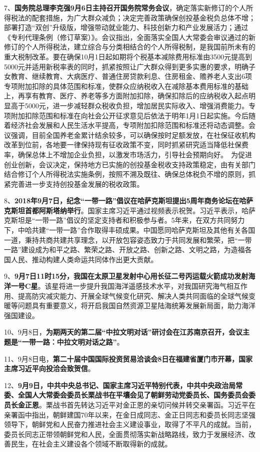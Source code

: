 7、{\textbf{国务院总理李克强9月6日主持召开国务院常务会议}}，确定落实新修订的个人所得税法的配套措施，为广大群众减负；决定完善政策确保创投基金税负总体不增；部署打造``双创''升级版，增强带动就业能力、科技创新力和产业发展活力；通过《专利代理条例（修订草案）》。会议指出，全面落实全国人大常委会审议通过的新修订的个人所得税法，建立综合与分类相结合的个人所得税制，是我国前所未有的重大税制改革。要在确保10月1日起如期将个税基本减除费用标准由3500元提高到5000元并适用新税率表的同时，抓紧按照让广大群众得到更多实惠的要求，明确子女教育、继续教育、大病医疗、普通住房贷款利息、住房租金、赡养老人支出6项专项附加扣除的具体范围和标准，使群众应纳税收入在减除基本费用标准的基础上，再享有教育、医疗、养老等多方面附加扣除，确保扣除后的应纳税收入起点明显高于5000元，进一步减轻群众税收负担，增加居民实际收入、增强消费能力。专项附加扣除范围和标准在向社会公开征求意见后依法于明年1月1日起实施。今后随着经济社会发展和人民生活水平提高，专项附加扣除范围和标准还将动态调整。会议强调，目前全国养老金累计结余较多，可以确保按时足额发放，在社保征收机构改革到位前，各地要一律保持现有征收政策不变，同时抓紧研究适当降低社保费率，确保总体上不增加企业负担，以激发市场活力，引导社会预期向好。　为促进创业创新，会议决定，保持地方已实施的创投基金税收支持政策稳定，由有关部门结合修订个人所得税法实施条例，按照不溯及既往、确保总体税负不增的原则，抓紧完善进一步支持创投基金发展的税收政策。

8、{\textbf{2018年9月7日，纪念``一带一路''倡议在哈萨克斯坦提出5周年商务论坛在哈萨克斯坦首都阿斯塔纳举行}}。国家主席习近平通过视频表示祝贺。习近平表示，哈萨克斯坦是``一带一路''倡议的坚定支持者和积极参与者。5年来，在双方共同努力下，中哈共建``一带一路''合作取得丰硕成果。中国愿同哈萨克斯坦及其他有关各国一道，秉持共商共建共享理念，以开放包容姿态致力于共同发展和繁荣，把``一带一路''建设成为和平之路、繁荣之路、开放之路、创新之路、文明之路，为造福各国人民、推动构建人类命运共同体作出更大贡献。

9、{\textbf{9月7日11时15分，我国在太原卫星发射中心用长征二号丙运载火箭成功发射海洋一号C星}}。该星将进一步提升我国海洋遥感技术水平，对我国研究海气相互作用、提高防灾减灾能力、开展全球气候变化研究、解决人类共同面临的全球气候变暖等问题具有重要意义，将开启我国自然资源卫星陆海统筹发展新局面，助力海洋强国建设。

10、9月8日，{\textbf{为期两天的第二届``中拉文明对话''研讨会在江苏南京召开，会议主题是``一带一路：中拉文明对话之路''}}。

11、9月8日电，{\textbf{第二十届中国国际投资贸易洽谈会8日在福建省厦门市开幕，国家主席习近平向投洽会致贺信}}。

12、{\textbf{9月9日，中共中央总书记、国家主席习近平特别代表，中共中央政治局常委、全国人大常委会委员长栗战书在平壤会见了朝鲜劳动党委员长、国务委员会委员长金正恩}}。栗战书首先转达习近平对金正恩的亲切问候并转交亲署函。习近平在亲署函中指出，朝鲜建国70年以来，在金日成同志、金正日同志和委员长同志坚强领导下，朝鲜党和人民奋力推进社会主义建设事业，取得了不平凡的成就。当前，委员长同志正带领朝鲜党和人民，全面贯彻落实新战略路线，致力于发展经济、改善民生，在社会主义建设各个领域不断取得新的成就。

